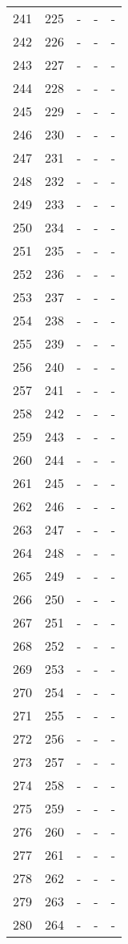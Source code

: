 \documentclass[10pt]{article}
\begin{document}
\begin {longtable}{l r r r r}
241 & 225 & - & - & - \\
242 & 226 & - & - & - \\
243 & 227 & - & - & - \\
244 & 228 & - & - & - \\
245 & 229 & - & - & - \\
246 & 230 & - & - & - \\
247 & 231 & - & - & - \\
248 & 232 & - & - & - \\
249 & 233 & - & - & - \\
250 & 234 & - & - & - \\
251 & 235 & - & - & - \\
252 & 236 & - & - & - \\
253 & 237 & - & - & - \\
254 & 238 & - & - & - \\
255 & 239 & - & - & - \\
256 & 240 & - & - & - \\
257 & 241 & - & - & - \\
258 & 242 & - & - & - \\
259 & 243 & - & - & - \\
260 & 244 & - & - & - \\
261 & 245 & - & - & - \\
262 & 246 & - & - & - \\
263 & 247 & - & - & - \\
264 & 248 & - & - & - \\
265 & 249 & - & - & - \\
266 & 250 & - & - & - \\
267 & 251 & - & - & - \\
268 & 252 & - & - & - \\
269 & 253 & - & - & - \\
270 & 254 & - & - & - \\
271 & 255 & - & - & - \\
272 & 256 & - & - & - \\
273 & 257 & - & - & - \\
274 & 258 & - & - & - \\
275 & 259 & - & - & - \\
276 & 260 & - & - & - \\
277 & 261 & - & - & - \\
278 & 262 & - & - & - \\
279 & 263 & - & - & - \\
280 & 264 & - & - & - \\

\end{longtable}
\end{document}
